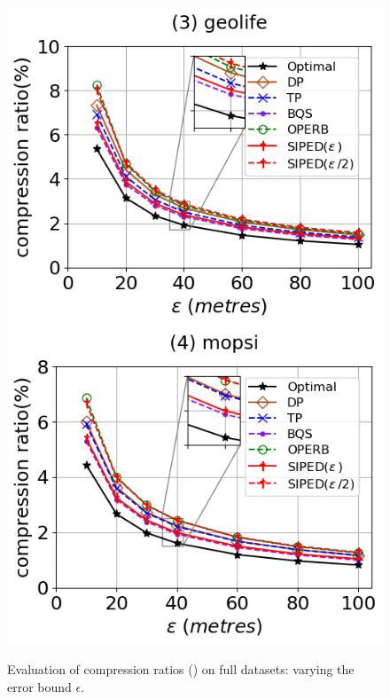 \begin{figure}[tb!]
	\includegraphics[scale=0.315]{Figures/Exp-PED-CR-epsilon-geolife.png}	\hspace{1ex}
	\includegraphics[scale=0.315]{Figures/Exp-PED-CR-epsilon-mopsi.png}		
	\vspace{-3ex}
	\caption{\small Evaluation of compression ratios (\ped) on full datasets: varying the error bound $\epsilon$.}
	\label{fig:cr-ped-epsilon}
	\vspace{-2ex}
\end{figure}

